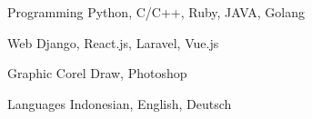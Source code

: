 \begin{cvskills}

  \cvskill
    {Programming} %
    {Python, C/C++, Ruby, JAVA, Golang} %

  \cvskill
    {Web} %
    {Django, React.js, Laravel, Vue.js} %

  \cvskill
    {Graphic} %
    {Corel Draw, Photoshop} %

  \cvskill
    {Languages} %
    {Indonesian, English, Deutsch} %

\end{cvskills}
